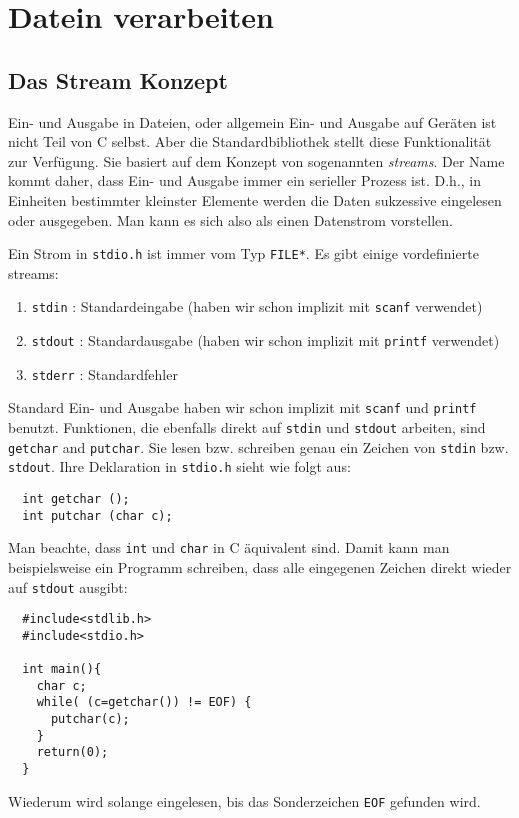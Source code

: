 \section{Datein verarbeiten}


\subsection{Das Stream Konzept}

Ein- und Ausgabe in Dateien, oder allgemein Ein- und Ausgabe auf Geräten ist nicht Teil von C selbst.
Aber die Standardbibliothek stellt diese Funktionalität zur Verfügung.
Sie basiert auf dem Konzept von sogenannten \emph{streams}.
Der Name kommt daher, dass Ein- und Ausgabe immer ein serieller Prozess ist.
D.h., in Einheiten bestimmter kleinster Elemente werden die Daten sukzessive eingelesen oder ausgegeben.
Man kann es sich also als einen Datenstrom vorstellen.

Ein Strom in \verb|stdio.h| ist immer vom Typ \verb|FILE*|.
Es gibt einige vordefinierte streams:
\begin{enumerate}
\item \verb|stdin| : Standardeingabe (haben wir schon implizit mit \texttt{scanf} verwendet) 
\item \texttt{stdout} : Standardausgabe (haben wir schon implizit mit \texttt{printf} verwendet) 
\item \texttt{stderr} : Standardfehler
\end{enumerate} 
Standard Ein- und Ausgabe haben wir schon implizit mit \texttt{scanf} und \texttt{printf} benutzt.
Funktionen, die ebenfalls direkt auf \verb|stdin| und \texttt{stdout} arbeiten, sind \verb|getchar| and \verb|putchar|.
Sie lesen bzw. schreiben genau ein Zeichen von \verb|stdin| bzw. \texttt{stdout}.
Ihre Deklaration in \verb|stdio.h| sieht wie folgt aus:
\begin{lstlisting}
  int getchar ();
  int putchar (char c);
\end{lstlisting}
Man beachte, dass \verb|int| und \verb|char| in C äquivalent sind.
Damit kann man beispielsweise ein Programm schreiben, dass alle eingegenen Zeichen direkt wieder auf \texttt{stdout} ausgibt:
\begin{lstlisting}
  #include<stdlib.h>
  #include<stdio.h>
  
  int main(){
    char c;
    while( (c=getchar()) != EOF) {
      putchar(c);
    }
    return(0);
  }
\end{lstlisting}
Wiederum wird solange eingelesen, bis das Sonderzeichen \verb|EOF| gefunden wird.

